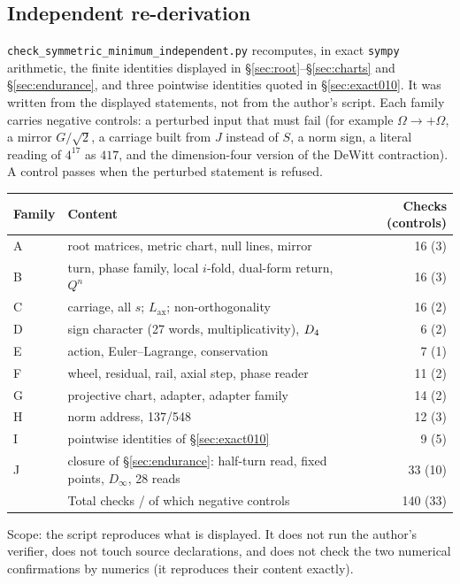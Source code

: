 \documentclass[11pt,a4paper]{article}
\newcommand{\Lax}{L_{\mathrm{ax}}}\newcommand{\Lpr}{L_{\mathrm{pr}}}
\theoremstyle{plain}
\theoremstyle{definition}
\theoremstyle{remark}
\begin{document}
\subsection{Independent re-derivation}\label{sec:indep}
\texttt{check\_symmetric\_minimum\_independent.py} recomputes, in exact \texttt{sympy} arithmetic, the finite identities displayed in \S\ref{sec:root}--\S\ref{sec:charts} and \S\ref{sec:endurance}, and three pointwise identities quoted in \S\ref{sec:exact010}. It was written from the displayed statements, not from the author's script. Each family carries negative controls: a perturbed input that must fail (for example $\Omega\to+\Omega$, a mirror $G/\sqrt2$, a carriage built from $J$ instead of $S$, a norm sign, a literal reading of $4^{17}$ as $417$, and the dimension-four version of the DeWitt contraction). A control passes when the perturbed statement is refused.

\begin{center}\small
\begin{tabular}{@{}llr@{}}
\toprule
Family & Content & Checks (controls)\\\midrule
A & root matrices, metric chart, null lines, mirror & 16 (3)\\
B & turn, phase family, local $i$-fold, dual-form return, $Q^n$ & 16 (3)\\
C & carriage, all $s$; $\Lax$; non-orthogonality & 16 (2)\\
D & sign character (27 words, multiplicativity), $D_4$ & 6 (2)\\
E & action, Euler--Lagrange, conservation & 7 (1)\\
F & wheel, residual, rail, axial step, phase reader & 11 (2)\\
G & projective chart, adapter, adapter family & 14 (2)\\
H & norm address, 137/548 & 12 (3)\\
I & pointwise identities of \S\ref{sec:exact010} & 9 (5)\\
J & closure of \S\ref{sec:endurance}: half-turn read, fixed points, $D_\infty$, 28 reads & 33 (10)\\\midrule
 & Total checks / of which negative controls & 140 (33)\\\bottomrule
\end{tabular}
\end{center}
Scope: the script reproduces what is displayed. It does not run the author's verifier, does not touch source declarations, and does not check the two numerical confirmations by numerics (it reproduces their content exactly).
\end{document}
